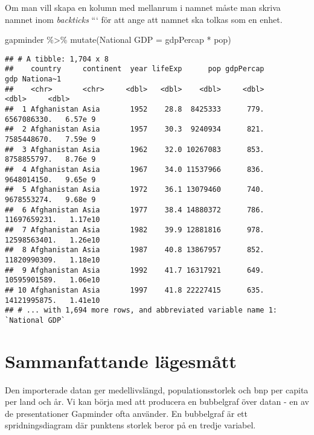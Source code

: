 \documentclass[
]{book}
\newenvironment{Shaded}{\begin{snugshade}}{\end{snugshade}}
\newcommand{\AttributeTok}[1]{\textcolor[rgb]{0.77,0.63,0.00}{#1}}
\newcommand{\FunctionTok}[1]{\textcolor[rgb]{0.00,0.00,0.00}{#1}}
\newcommand{\NormalTok}[1]{#1}
\newcommand{\OtherTok}[1]{\textcolor[rgb]{0.56,0.35,0.01}{#1}}
\newcommand{\SpecialCharTok}[1]{\textcolor[rgb]{0.00,0.00,0.00}{#1}}
\newcommand{\StringTok}[1]{\textcolor[rgb]{0.31,0.60,0.02}{#1}}
\theoremstyle{definition}
\theoremstyle{definition}
\theoremstyle{definition}
\theoremstyle{definition}
\theoremstyle{remark}
\begin{document}
Om man vill skapa en kolumn med mellanrum i namnet måste man skriva namnet inom \emph{backticks} ``` för att ange att namnet ska tolkas som en enhet.

\begin{Shaded}
\begin{Highlighting}[]
\NormalTok{gapminder }\SpecialCharTok{\%\textgreater{}\%} 
  \FunctionTok{mutate}\NormalTok{(}\StringTok{\textasciigrave{}}\AttributeTok{National GDP}\StringTok{\textasciigrave{}} \OtherTok{=}\NormalTok{ gdpPercap }\SpecialCharTok{*}\NormalTok{ pop)}
\end{Highlighting}
\end{Shaded}

\begin{verbatim}
## # A tibble: 1,704 x 8
##    country     continent  year lifeExp      pop gdpPercap          gdp Nationa~1
##    <chr>       <chr>     <dbl>   <dbl>    <dbl>     <dbl>        <dbl>     <dbl>
##  1 Afghanistan Asia       1952    28.8  8425333      779.  6567086330.   6.57e 9
##  2 Afghanistan Asia       1957    30.3  9240934      821.  7585448670.   7.59e 9
##  3 Afghanistan Asia       1962    32.0 10267083      853.  8758855797.   8.76e 9
##  4 Afghanistan Asia       1967    34.0 11537966      836.  9648014150.   9.65e 9
##  5 Afghanistan Asia       1972    36.1 13079460      740.  9678553274.   9.68e 9
##  6 Afghanistan Asia       1977    38.4 14880372      786. 11697659231.   1.17e10
##  7 Afghanistan Asia       1982    39.9 12881816      978. 12598563401.   1.26e10
##  8 Afghanistan Asia       1987    40.8 13867957      852. 11820990309.   1.18e10
##  9 Afghanistan Asia       1992    41.7 16317921      649. 10595901589.   1.06e10
## 10 Afghanistan Asia       1997    41.8 22227415      635. 14121995875.   1.41e10
## # ... with 1,694 more rows, and abbreviated variable name 1: `National GDP`
\end{verbatim}

\hypertarget{sammanfattande-luxe4gesmuxe5tt}{%
\section{Sammanfattande lägesmått}\label{sammanfattande-luxe4gesmuxe5tt}}

Den importerade datan ger medellivslängd, populationsstorlek och bnp per capita per land och år. Vi kan börja med att producera en bubbelgraf över datan - en av de presentationer Gapminder ofta använder. En bubbelgraf är ett spridningsdiagram där punktens storlek beror på en tredje variabel.
\end{document}
